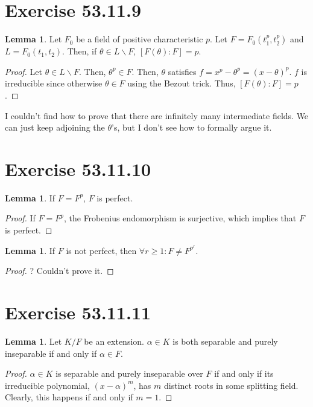 \documentclass{article}
\theoremstyle{definition}
\newtheorem{lemma}[theorem]{Lemma}
\begin{document}
\newpage

\section{Exercise 53.11.9}

\begin{lemma}
    Let $F_{0}$ be a field of positive characteristic $p$. Let $F = F_{0}(t_{1}^{p}, t_{2}^{p})$ and 
    $L = F_{0}(t_{1}, t_{2})$. Then, if $\theta \in L \backslash F$, $[F(\theta): F] = p$.
\end{lemma}
\begin{proof}
    Let $\theta \in L \backslash F$. Then, $\theta^{p} \in F$.
    Then, $\theta$ satisfies $f = x^{p} - \theta^{p} = (x - \theta)^{p}$.
    $f$ is irreducible since otherwise $\theta \in F$ using the Bezout trick.
    Thus, $[F(\theta) : F] = p$.
\end{proof}

I couldn't find how to prove that there are infinitely many intermediate fields. We can just keep adjoining
the $\theta$'s, but I don't see how to formally argue it.

\newpage

\section{Exercise 53.11.10}

\begin{lemma}
    If $F = F^{p}$, $F$ is perfect.
\end{lemma}
\begin{proof}
    If $F = F^{p}$, the Frobenius endomorphism is surjective, which implies
    that $F$ is perfect.
\end{proof}

\begin{lemma}
    If $F$ is not perfect, then $\forall r \geq 1: F \neq F^{p^{r}}$.
\end{lemma}
\begin{proof}
    ? Couldn't prove it.
\end{proof}

\newpage

\section{Exercise 53.11.11}

\begin{lemma}
    Let $K/F$ be an extension. $\alpha \in K$ is both separable and purely inseparable
    if and only if $\alpha \in F$.
\end{lemma}
\begin{proof}
    $\alpha \in K$ is separable and purely inseparable over $F$ if and only if 
    its irreducible polynomial, $(x - \alpha)^{m}$, has $m$ distinct roots
    in some splitting field. Clearly, this happens if and only if $m = 1$.
\end{proof}
\end{document}
